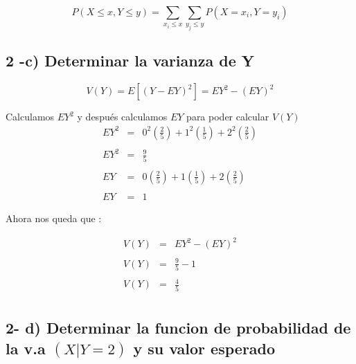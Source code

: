 \documentclass[12pt]{article}
\begin{document}
\begin{equation*}
    P \left(X \le x , Y \le y\right) =  \sum_{x_i \le x}^{} \sum_{y_j \le y}^{}  P \left(X = x_i , Y = y_i\right)
\end{equation*}



\subsection*{2 -c) Determinar la varianza de Y}

\begin{equation*}
    V\left(Y\right) = E \left[\left(Y - EY\right)^2\right] = EY^2 - \left(EY\right)^2
\end{equation*}

Calculamos $EY^2$ y despu\'es calculamos $EY$ para poder calcular $V\left(Y\right)$
\begin{equation*}
    \begin{array}{rcl}
        EY^2 & = & \displaystyle 0^2 \left(\frac{2}{5} \right)  + 1^2  \left(\frac{1}{5}\right) + 2^2 \left( \frac{2}{5}\right)
        \\
        \\
        EY^2 & = & \displaystyle \frac{9}{5}
        \\
        \\
        EY   & = & \displaystyle 0 \left(\frac{2}{5} \right)  + 1  \left(\frac{1}{5}\right) + 2 \left( \frac{2}{5}\right)
        \\
        \\
        EY   & = & 1
    \end{array}
\end{equation*}

Ahora nos queda que :

\begin{equation*}
    \begin{array}{rcl}
        V\left(Y\right) & = & EY^2 - \left(EY\right)^2
        \\
        \\
        V\left(Y\right) & = & \displaystyle \frac{9}{5} - 1
        \\
        \\
        V\left(Y\right) & = & \displaystyle \frac{4}{5}
        \\
    \end{array}
\end{equation*}

\subsection*{2- d) Determinar la funcion de probabilidad de la v.a $\left(X|Y = 2\right)$ y su valor esperado }
\end{document}

